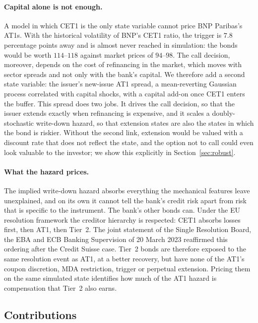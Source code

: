 \paragraph{Capital alone is not enough.}
A model in which CET1 is the only state variable cannot price BNP Paribas's AT1s. With
the historical volatility of BNP's CET1 ratio, the trigger is $7.8$ percentage points
away and is almost never reached in simulation: the bonds would be worth $114$--$118$
against market prices of $94$--$98$. The call decision, moreover, depends on the cost
of refinancing in the market, which moves with sector spreads and not only with the
bank's capital. We therefore add a second state variable: the issuer's new-issue AT1
spread, a mean-reverting Gaussian process correlated with capital shocks, with a
capital add-on once CET1 enters the buffer. This spread does two jobs. It drives the
call decision, so that the issuer extends exactly when refinancing is expensive, and it
scales a doubly-stochastic write-down hazard, so that extension states are also the
states in which the bond is riskier. Without the second link, extension would be valued
with a discount rate that does not reflect the state, and the option not to call could
even look valuable to the investor; we show this explicitly in
Section~\ref{sec:robust}.

\paragraph{What the hazard prices.}
The implied write-down hazard absorbs everything the mechanical features leave
unexplained, and on its own it cannot tell the bank's credit risk apart from risk that is
specific to the instrument. The bank's other bonds can. Under the EU resolution
framework the creditor hierarchy is respected: CET1 absorbs losses first, then AT1, then
Tier~2. The joint statement of the Single Resolution Board, the EBA and ECB Banking
Supervision of 20 March 2023 reaffirmed this ordering after the Credit Suisse case.
Tier~2 bonds are therefore exposed to the same resolution event as AT1, at a better
recovery, but have none of the AT1's coupon discretion, MDA restriction, trigger or
perpetual extension. Pricing them on the same simulated state identifies how much of the
AT1 hazard is compensation that Tier~2 also earns.

\subsection{Contributions}

